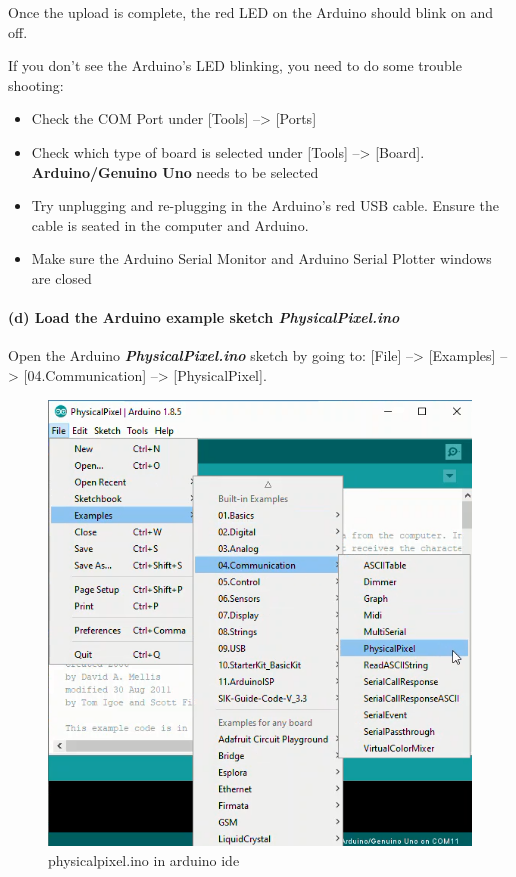 \documentclass[11pt]{article}
\providecommand{\tightlist}{%
      \setlength{\itemsep}{0pt}\setlength{\parskip}{0pt}}
\begin{document}
Once the upload is complete, the red LED on the Arduino should blink on
and off.

If you don't see the Arduino's LED blinking, you need to do some trouble
shooting:

\begin{itemize}
\tightlist
\item
  Check the COM Port under {[}Tools{]} --\textgreater{} {[}Ports{]}
\item
  Check which type of board is selected under {[}Tools{]}
  --\textgreater{} {[}Board{]}. \textbf{Arduino/Genuino Uno} needs to be
  selected
\item
  Try unplugging and re-plugging in the Arduino's red USB cable. Ensure
  the cable is seated in the computer and Arduino.
\item
  Make sure the Arduino Serial Monitor and Arduino Serial Plotter
  windows are closed
\end{itemize}

    \hypertarget{d-load-the-arduino-example-sketch-physicalpixel.ino}{%
\paragraph{\texorpdfstring{(d) Load the Arduino example sketch
\textbf{\emph{PhysicalPixel.ino}}}{(d) Load the Arduino example sketch PhysicalPixel.ino}}\label{d-load-the-arduino-example-sketch-physicalpixel.ino}}

Open the Arduino \textbf{\emph{PhysicalPixel.ino}} sketch by going to:
{[}File{]} --\textgreater{} {[}Examples{]} --\textgreater{}
{[}04.Communication{]} --\textgreater{} {[}PhysicalPixel{]}.

\begin{figure}
\centering
\includegraphics{images/examples_com_physicalpixel.png}
\caption{physicalpixel.ino in arduino ide}
\end{figure}
\end{document}
